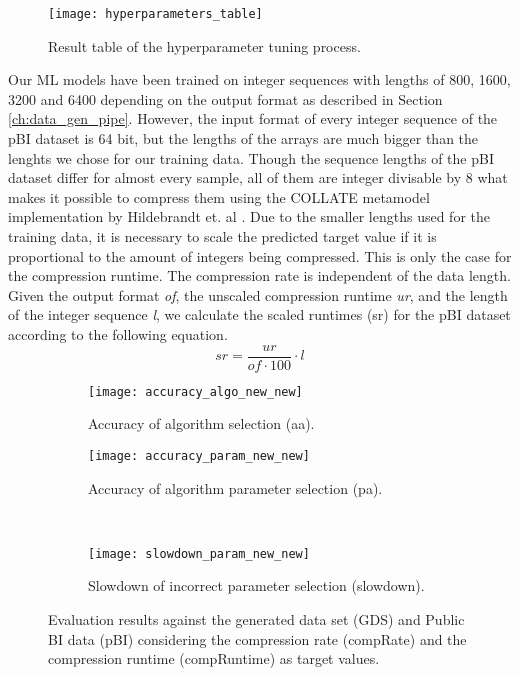 \begin{figure}[h]
    \centering
    \texttt{[image: hyperparameters\_table]}
    \caption{Result table of the hyperparameter tuning process.}
    \label{fig:table_hyperparameters}
\end{figure}

Our ML models have been trained on integer sequences with lengths of 800, 1600, 3200 and 6400 depending on the output format as described in Section \ref{ch:data_gen_pipe}. However, the input format of every integer sequence of the pBI dataset is 64 bit, but the lengths of the arrays are much bigger than the lenghts we chose for our training data. Though the sequence lengths of the pBI dataset differ for almost every sample, all of them are integer divisable by 8 what makes it possible to compress them using the COLLATE metamodel implementation by Hildebrandt et. al \cite{Hildebrandt2017}.
Due to the smaller lengths used for the training data, it is necessary to scale the predicted target value if it is proportional to the amount of integers being compressed. This is only the case for the compression runtime. The compression rate is independent of the data length. Given the output format \emph{of}, the unscaled compression runtime \emph{ur}, and the length of the integer sequence \emph{l}, we calculate the scaled runtimes (sr) for the pBI dataset according to the following equation.
\begin{equation}
    sr = \frac{ur}{of \cdot 100} \cdot {l}
\end{equation}

\begin{figure}
    \centering
    \begin{subfigure}{.5\textwidth}
      \centering
      \texttt{[image: accuracy\_algo\_new\_new]}
      \caption{Accuracy of algorithm selection (aa).}
    \end{subfigure}%
    \begin{subfigure}{.5\textwidth}
      \centering
      \texttt{[image: accuracy\_param\_new\_new]}
      \caption{Accuracy of algorithm parameter selection (pa).}
    \end{subfigure}
    \\
    \begin{subfigure}{.5\textwidth}
      \centering
      \texttt{[image: slowdown\_param\_new\_new]}
      \caption{Slowdown of incorrect parameter selection (slowdown).}
    \end{subfigure}%
    \caption{Evaluation results against the generated data set (GDS) and Public BI data (pBI) considering the compression rate (compRate) and the compression runtime (compRuntime) as target values.}
    \label{fig:validation-results}
\end{figure}

